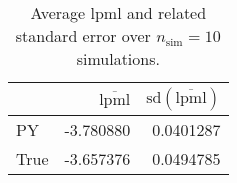 \begin{table}[H]

\caption{Average lpml and related standard error over $n_{\text{sim}} = 10$ simulations.}
\centering
\begin{tabular}[t]{lrr}
\toprule
  & $\overbar{\text{lpml}}$ & $\text{sd}(\overbar{\text{lpml}})$\\
\midrule
PY & -3.780880 & 0.0401287\\
True & -3.657376 & 0.0494785\\
\bottomrule
\end{tabular}
\end{table}